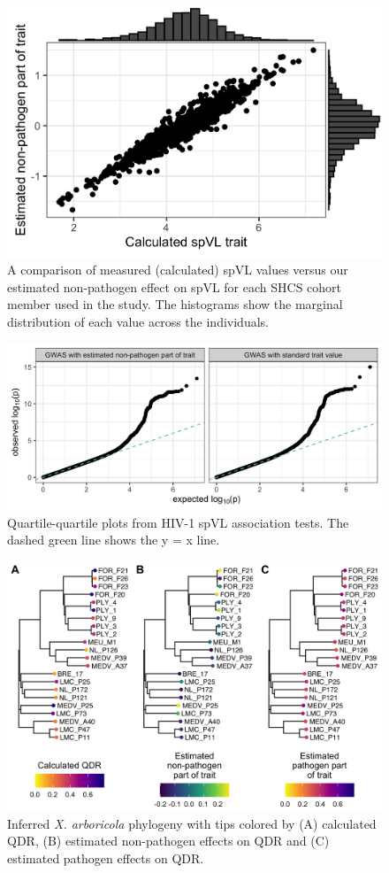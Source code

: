 \documentclass[11pt]{article}
\begin{document}
\begin{doublespace}
\begin{figure}[H]
\begin{center}
\includegraphics[width = 0.462\linewidth]{figures/trait_values.png}
	\caption{A comparison of measured (calculated) spVL values versus our estimated non-pathogen effect on spVL for each SHCS cohort member used in the study. The histograms show the marginal distribution of each value across the individuals.}
	\label{fig:trait-comparison}
	\end{center}
\end{figure}

\begin{figure}[H]
	\centering
	\includegraphics[width=\linewidth]{figures/qq_plots.png}
	\caption{Quartile-quartile plots from HIV-1 spVL association tests. The dashed green line shows the y = x line.}
	\label{fig:qq-plots}
\end{figure}

\begin{figure}[H]
\begin{center}
\includegraphics[width = \linewidth]{figures/qdr_on_tree_arboricola.png}
	\caption{Inferred \emph{X. arboricola} phylogeny with tips colored by (A) calculated QDR, (B) estimated non-pathogen effects on QDR and (C) estimated pathogen effects on QDR.}
	\label{fig:qdr-on-tree}
	\end{center}
\end{figure}


\end{doublespace}
\end{document}
